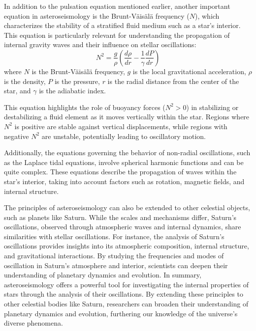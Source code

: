 \documentclass{article}
\begin{document}
In addition to the pulsation equation mentioned earlier, another important equation in asteroseismology is the Brunt-Väisälä frequency (\(N\)), which characterizes the stability of a stratified fluid medium such as a star's interior. This equation is particularly relevant for understanding the propagation of internal gravity waves and their influence on stellar oscillations:
\begin{equation}
 N^2 = \frac{g}{\rho}\left(\frac{d\rho}{dr} - \frac{1}{\gamma}\frac{dP}{dr}\right)
\end{equation}
where \(N\) is the Brunt-Väisälä frequency, \(g\) is the local gravitational acceleration, \(\rho\) is the density, \(P\) is the pressure, \(r\) is the radial distance from the center of the star, and \(\gamma\) is the adiabatic index.

This equation highlights the role of buoyancy forces (\(N^2 > 0\)) in stabilizing or destabilizing a fluid element as it moves vertically within the star. Regions where \(N^2\) is positive are stable against vertical displacements, while regions with negative \(N^2\) are unstable, potentially leading to oscillatory motion.

Additionally, the equations governing the behavior of non-radial oscillations, such as the Laplace tidal equations, involve spherical harmonic functions and can be quite complex. These equations describe the propagation of waves within the star's interior, taking into account factors such as rotation, magnetic fields, and internal structure.

The principles of asteroseismology can also be extended to other celestial objects, such as planets like Saturn. While the scales and mechanisms differ, Saturn's oscillations, observed through atmospheric waves and internal dynamics, share similarities with stellar oscillations. For instance, the analysis of Saturn's oscillations provides insights into its atmospheric composition, internal structure, and gravitational interactions. By studying the frequencies and modes of oscillation in Saturn's atmosphere and interior, scientists can deepen their understanding of planetary dynamics and evolution. In summary, asteroseismology offers a powerful tool for investigating the internal properties of stars through the analysis of their oscillations. By extending these principles to other celestial bodies like Saturn, researchers can broaden their understanding of planetary dynamics and evolution, furthering our knowledge of the universe's diverse phenomena.
\end{document}
